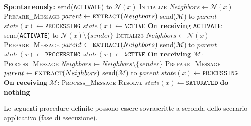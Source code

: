 \begin{algorithm}[H]
\caption{Saturation}
\begin{algorithmic}[1]
    \Statex \hspace{1.5em} \textbf{Spontaneously:}
    \State send(\texttt{ACTIVATE}) to $\mathcal{N}(x)$
    \State \textsc{Initialize}
    \State $Neighbors \leftarrow \mathcal{N}(x)$
        \State \textsc{Prepare\_Message}
        \State $parent \leftarrow \textsc{extract}(Neighbors)$
        \State send($\mathcal{M}$) to $parent$
        \State $state(x) \leftarrow \texttt{PROCESSING}$
    \Else
        \State $state(x) \leftarrow \texttt{ACTIVE}$
    \EndIf
    \Statex
    \Statex \hspace{1.5em} \textbf{On receiving} \texttt{ACTIVATE}:
    \State send(\texttt{ACTIVATE}) to $\mathcal{N}(x) \setminus \{sender\}$
    \State \textsc{Initialize}
    \State $Neighbors \leftarrow \mathcal{N}(x)$
        \State \textsc{Prepare\_Message}
        \State $parent \leftarrow \textsc{extract}(Neighbors)$
        \State send($\mathcal{M}$) to $parent$
        \State $state(x) \leftarrow \texttt{PROCESSING}$
    \Else
        \State $state(x) \leftarrow \texttt{ACTIVE}$
    \EndIf
\EndIf
\Statex
{}
    \Statex \hspace{1.5em} \textbf{On receiving} $\mathcal{M}$:
    \State \textsc{Process\_Message}
    \State $Neighbors \leftarrow Neighbors \setminus \{sender\}$
        \State \textsc{Prepare\_Message}
        \State $parent \leftarrow \textsc{extract}(Neighbors)$
        \State send($\mathcal{M}$) to $parent$
        \State $state(x) \leftarrow \texttt{PROCESSING}$
    \EndIf
\EndIf
\Statex
{}
    \Statex \hspace{1.5em} \textbf{On receiving} $\mathcal{M}$:
    \State \textsc{Process\_Message}
    \State \textsc{Resolve}
    \State $state(x) \leftarrow \texttt{SATURATED}$
\EndIf
\Statex
{}
    \State \textbf{do nothing}
\EndIf
\end{algorithmic}
\end{algorithm}

Le seguenti procedure definite possono essere sovrascritte a seconda dello scenario applicativo (fase di esecuzione).

